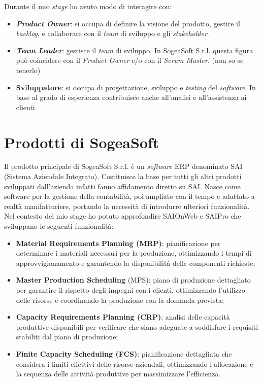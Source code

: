     \noindent Durante il mio \textit{stage} ho avuto modo di interagire con: 
    \begin{itemize}
        \item \textbf{\textit{Product Owner}}: si occupa di definire la visione del prodotto, gestire il \textit{backlog}, e collaborare con il \textit{team} di sviluppo e gli \textit{stakeholder}.
        \item \textbf{\textit{Team Leader}}: gestisce il \textit{team} di sviluppo. In SogeaSoft S.r.l. questa figura può coincidere con il \textit{Product Owner} e/o con il \textit{Scrum Master}. (non so se tenerlo)
        \item \textbf{Sviluppatore}: si occupa di progettazione, sviluppo e \textit{testing} del \textit{software}. In base al grado di esperienza contribuisce anche all'analisi e all'assistenza ai clienti. 
    \end{itemize}


    \section{Prodotti di SogeaSoft}

    Il prodotto principale di SogeaSoft S.r.l. è un \textit{software} ERP denominato SAI (Sistema Aziendale Integrato). Costituisce la base per tutti gli altri prodotti sviluppati dall'azienda infatti fanno affidamento diretto su SAI. Nasce come software per la gestione della contabilità, poi ampliato con il tempo e adattato a realtà manifatturiere, portando la necessità di introdurre ulteriori funzionalità. 
    Nel contesto del mio stage ho potuto approfondire SAIOnWeb e SAIPro che sviluppano le seguenti funzionalità:
    \begin{itemize}
        \item \textbf{Material Requirements Planning (MRP)}: pianificazione per determinare i materiali necessari per la produzione, ottimizzando i tempi di approvvigionamento e garantendo la disponibilità delle componenti richieste;
        \item \textbf{Master Production Scheduling} (MPS): piano di produzione dettagliato per garantire il rispetto degli impegni con i clienti, ottimizzando l’utilizzo delle risorse e coordinando la produzione con la domanda prevista;
        \item \textbf{Capacity Requirements Planning (CRP)}: analisi delle capacità produttive disponibili per verificare che siano adeguate a soddisfare i requisiti stabiliti dal piano di produzione;
        \item \textbf{Finite Capacity Scheduling (FCS)}: pianificazione dettagliata che considera i limiti effettivi delle risorse aziendali, ottimizzando l'allocazione e la sequenza delle attività produttive per massimizzare l'efficienza.       
    \end{itemize}
    
